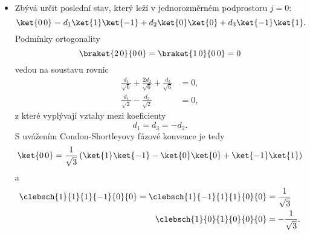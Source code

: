 \begin{solution}
\begin{itemize}
	\item
		Zbývá určit poslední stav, který leží v jednorozměrném podprostoru $j=0$:
		\begin{equation}
			\ket{0\,0}
				=d_{1}\ket{1}\ket{-1}+d_{2}\ket{0}\ket{0}+d_{3}\ket{-1}\ket{1}.
		\end{equation}
		Podmínky ortogonality
		\begin{equation}
			\braket{2\,0}{0\,0}
				=\braket{1\,0}{0\,0}=0
		\end{equation}
		vedou na soustavu rovnic
		\begin{subequations}
			\begin{align}
				\frac{d_{1}}{\sqrt{6}}+\frac{2d_{2}}{\sqrt{6}}+\frac{d_{3}}{\sqrt{6}}
					&=0,\\
				\frac{d_{1}}{\sqrt{2}}-\frac{d_{3}}{\sqrt{2}}
					&=0,
			\end{align}
		\end{subequations}
		z které vyplývají vztahy mezi koeficienty
		\begin{equation}
			d_{1}
				=d_{3}
				=-d_{2}.
		\end{equation}
		S uvážením Condon-Shortleyovy fázové konvence je tedy 
		\begin{equation}
			\ket{0\,0}
				=\frac{1}{\sqrt{3}}\left(\ket{1}\ket{-1}-\ket{0}\ket{0}+\ket{-1}\ket{1}\right)
		\end{equation}
		a
		\begin{subequations}
			\begin{align}
			\clebsch{1}{1}{1}{-1}{0}{0}
				=\clebsch{1}{-1}{1}{1}{0}{0}
				&=\frac{1}{\sqrt{3}}\\
			\clebsch{1}{0}{1}{0}{0}{0}
				&=-\frac{1}{\sqrt{3}}.
			\end{align}
		\end{subequations}
	\end{itemize}


\end{solution}

